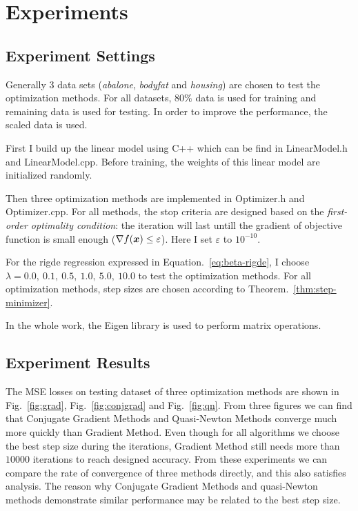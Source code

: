 \section{Experiments}

\subsection{Experiment Settings}
Generally \(3\) data sets (\emph{abalone}, \emph{bodyfat} and \emph{housing}) are 
chosen to test the optimization methods. For all datasets, \(80\%\) data is used for
training and remaining data is used for testing. In order to improve the performance,
the scaled data is used.

First I build up the linear model using C++ which can be find in LinearModel.h and 
LinearModel.cpp. Before training, the weights of this linear model are initialized
randomly.

Then three optimization methods are implemented in Optimizer.h and Optimizer.cpp.
For all methods, the stop criteria are designed based on the 
\emph{first-order optimality condition}: the iteration will last untill the gradient 
of objective function is small enough (\(\nabla f(\bm{x}) \le \varepsilon\)). Here I set
\(\varepsilon\) to \(10^{-10}\).

For the rigde regression expressed in Equation.~\ref{eq:beta-rigde}, I choose 
\(\lambda = 0.0, ~0.1, ~0.5, ~1.0, ~5.0, ~10.0\) to test the optimization methods.
For all optimization methods, step sizes are chosen according to Theorem.~\ref{thm:step-minimizer}.

In the whole work, the Eigen library is used to perform matrix operations.

\subsection{Experiment Results}
The MSE losses on testing dataset of three optimization methods are shown in Fig.~\ref{fig:grad}, Fig.~\ref{fig:conjgrad}
and Fig.~\ref{fig:qn}. From three figures we can find that Conjugate Gradient Methods and Quasi-Newton Methods 
converge much more quickly than Gradient Method. Even though for all algorithms we choose the best step size during the iterations,
Gradient Method still needs more than \(10000\) iterations to reach designed accuracy. From these experiments we can compare the rate
of convergence of three methods directly, and this also satisfies analysis. The reason why Conjugate Gradient Methods and quasi-Newton
methods demonstrate similar performance may be related to the best step size.

